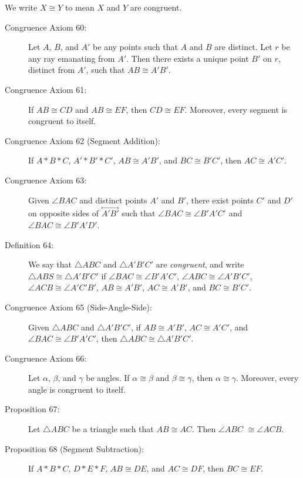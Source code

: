 \documentclass{article}
\newcommand{\linethrough}[1]{\stackrel{\longleftrightarrow}{#1} }
\begin{document}
We write $X \cong Y$ to mean $X$ and $Y$ are congruent.

\begin{description}

\item[Congruence Axiom 60:] Let $A$, $B$, and $A'$ be any points such that $A$ and $B$ are distinct. Let $r$ be any ray emanating from $A'$. Then there exists a unique point $B'$ on $r$, distinct from $A'$, such that $AB \cong A'B'$.

\item[Congruence Axiom 61:] If $AB \cong CD$ and $AB \cong EF$, then $CD \cong EF$. Moreover, every segment is congruent to itself.

\item[Congruence Axiom 62 (Segment Addition):] If $A*B*C$, $A'*B'*C'$, $AB \cong A'B'$, and $BC \cong B'C'$, then $AC \cong A'C'$.

\item[Congruence Axiom 63:] Given $\angle BAC$ and distinct points $A'$ and $B'$, there exist points $C'$ and $D'$ on opposite sides of $\linethrough{A'B'}$ such that $\angle BAC \cong \angle B'A'C'$ and $\angle BAC \cong \angle B'A'D'$.

\item[Definition 64:] We say that $\triangle ABC$ and $\triangle A'B'C'$ are \emph{congruent}, and write $\triangle ABS \cong \triangle A'B'C'$ if $\angle BAC \cong \angle B'A'C'$, $\angle ABC \cong \angle A'B'C'$, $\angle ACB \cong \angle A'C'B'$, $AB \cong A'B'$, $AC \cong A'B'$, and $BC \cong B'C'$.

\item[Congruence Axiom 65 (Side-Angle-Side):] Given $\triangle ABC$ and $\triangle A'B'C'$, if $AB \cong A'B'$, $AC \cong A'C'$, and $\angle BAC \cong \angle B'A'C'$, then $\triangle ABC \cong \triangle A'B'C'$.

\item[Congruence Axiom 66:] Let $\alpha$, $\beta$, and $\gamma$ be angles. If $\alpha \cong \beta$ and $\beta \cong \gamma$, then $\alpha \cong \gamma$. Moreover, every angle is congruent to itself.

\item[Proposition 67:] Let $\triangle ABC$ be a triangle such that $AB \cong AC$. Then $\angle ABC$ $\cong \angle ACB$.

\item[Proposition 68 (Segment Subtraction):] If $A*B*C$, $D*E*F$, $AB \cong DE$, and $AC \cong DF$, then $BC \cong EF$.


\end{description}
\end{document}
